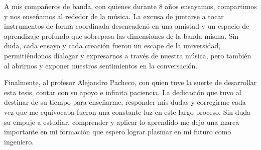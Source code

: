 A mis compañeros de banda, con quienes durante 8 años ensayamos, compartimos y nos enseñamos al rededor de la música. La excusa de juntarse a tocar instrumentos de forma coordinada desencadenó en una amistad y un espacio de aprendizaje profundo que sobrepasa las dimensiones de la banda misma. Sin duda, cada ensayo y cada creación fueron un escape de la universidad, permitiéndonos dialogar y expresarnos a través de nuestra música, pero también al abrirnos y exponer nuestros sentimientos en la conversación.

Finalmente, al profesor Alejandro Pacheco, con quien tuve la suerte de desarrollar esta tesis, contar con su apoyo e infinita paciencia. La dedicación que tuvo al destinar de su tiempo para enseñarme, responder mis dudas y corregirme cada vez que me equivocaba fueron una constante luz en este largo proceso.  Sin duda su empuje a estudiar, comprender y aplicar lo aprendido me dejo una marca importante en mi formación que espero lograr plasmar en mi futuro como ingeniero. 

